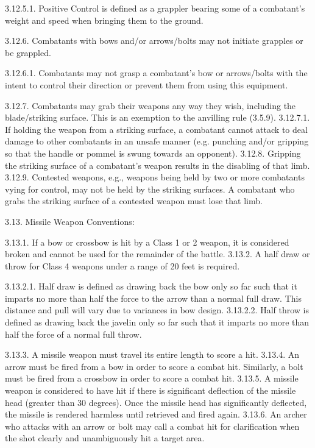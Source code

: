 \documentclass[12pt]{article}
\begin{document}
\begin{level}[start=0]
3.12.5.1. Positive Control is defined as a grappler bearing some of a combatant’s weight and speed when bringing them to the ground.

3.12.6. Combatants with bows and/or arrows/bolts may not initiate grapples or be grappled.

3.12.6.1. Combatants may not grasp a combatant’s bow or arrows/bolts with the intent to control their direction or prevent them from using this equipment.

3.12.7. Combatants may grab their weapons any way they wish, including the blade/striking surface. This is an exemption to the anvilling rule (3.5.9).
         3.12.7.1. If holding the weapon from a striking surface, a combatant cannot attack to deal damage to other combatants in an unsafe manner (e.g. punching and/or gripping so that the handle or pommel is swung towards an opponent).
3.12.8. Gripping the striking surface of a combatant’s weapon results in the disabling of that limb.
3.12.9. Contested weapons, e.g., weapons being held by two or more combatants vying for control, may not be held by the striking surfaces. A combatant who grabs the striking surface of a contested weapon must lose that limb.

3.13. Missile Weapon Conventions:

3.13.1. If a bow or crossbow is hit by a Class 1 or 2 weapon, it is considered broken and cannot be used for the remainder of the battle.
3.13.2. A half draw or throw for Class 4 weapons under a range of 20 feet is required.

3.13.2.1. Half draw is defined as drawing back the bow only so far such that it imparts no more than half the force to the arrow than a normal full draw. This distance and pull will vary due to variances in bow design.
3.13.2.2. Half throw is defined as drawing back the javelin only so far such that it imparts no more than half the force of a normal full throw.

3.13.3. A missile weapon must travel its entire length to score a hit.
3.13.4. An arrow must be fired from a bow in order to score a combat hit. Similarly, a bolt must be fired from a crossbow in order to score a combat hit.
3.13.5. A missile weapon is considered to have hit if there is significant deflection of the missile head (greater than 30 degrees). Once the missile head has significantly deflected, the missile is rendered harmless until retrieved and fired again.
3.13.6. An archer who attacks with an arrow or bolt may call a combat hit for clarification when the shot clearly and unambiguously hit a target area.


\end{level}
\end{document}
